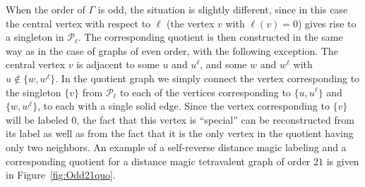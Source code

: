 \documentclass[11 pt,english]{article}
\newcommand{\G}{\Gamma}
\newcommand{\cP}{\mathcal{P}}
\theoremstyle{definition}
\begin{document}
When the order of $\G$ is odd, the situation is slightly different, since in this case the central vertex with respect to $\ell$ (the vertex $v$ with $\ell(v) = 0$) gives rise to a singleton in $\cP_\ell$. The corresponding quotient is then constructed in the same way as in the case of graphs of even order, with the following exception. The central vertex $v$ is adjacent to some $u$ and $u^\ell$, and some $w$ and $w^\ell$ with $u \notin \{w, w^\ell\}$. In the quotient graph we simply connect the vertex corresponding to the singleton $\{v\}$ from $\cP_\ell$ to each of the vertices corresponding to $\{u,u^\ell\}$ and $\{w,w^\ell\}$, to each with a single solid edge. Since the vertex corresponding to $\{v\}$ will be labeled $0$, the fact that this vertex is ``special'' can be reconstructed from its label as well as from the fact that it is the only vertex in the quotient having only two neighbors. An example of a self-reverse distance magic labeling and a corresponding quotient for a distance magic tetravalent graph of order $21$ is given in Figure~\ref{fig:Odd21quo}.
\end{document}
